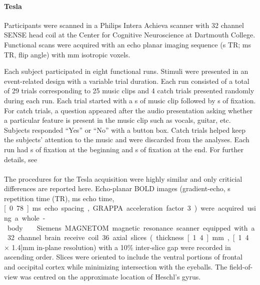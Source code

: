\paragraph{\unit[3]{Tesla}}
%
Participants were scanned in a Philips Intera Achieva scanner with 32 channel
SENSE head coil at the Center for Cognitive Neuroscience at Dartmouth College.
Functional scans were acquired with an echo planar imaging sequence
(\unit[2]{s} TR; \unit[35]{ms} TR, \unit[90]{\textdegree} flip angle) with
\unit[3]{mm} isotropic voxels.

Each subject participated in eight functional runs. Stimuli were presented in
an event-related design with a variable trial duration. Each run consisted of a
total of 29 trials corresponding to 25 music clips and 4 catch trials presented
randomly during each run. Each trial started with a \unit[6]{s} of music clip
followed by \unit[4-8]{s} of fixation. For catch trials, a question appeared
after the audio presentation asking whether a particular feature is present in
the music clip such as vocals, guitar, etc. Subjects responded “Yes” or “No”
with a button box. Catch trials helped keep the subjects’ attention to the
music and were discarded from the analyses. Each run had \unit[4]{s} of
fixation at the beginning and \unit[10]{s} of fixation at the end. For further
details, see \citet{CTK+2012}

\paragraph{\sevenT}
%
The procedures for the \unit[7]{Tesla} acquisition were highly similar and only
criticial differences are reported here. Echo-planar BOLD images
(gradient-echo, \unit[2]{s} repetition time (TR), \unit[22]{ms} echo time,
\unit[0.78]{ms} echo spacing, GRAPPA acceleration factor 3) were acquired using
a whole-body \sevenT\ Siemens MAGNETOM magnetic resonance scanner equipped with
a 32 channel brain receive coil. 36 axial slices (thickness \unit[1.4]{mm},
\unit[1.4 $\times$ 1.4]{mm} in-plane resolution) with a 10\% inter-slice gap
were recorded in ascending order.  Slices were oriented to include the ventral
portions of frontal and occipital cortex while minimizing intersection with the
eyeballs. The field-of-view was centred on the approximate location of Heschl's
gyrus.

